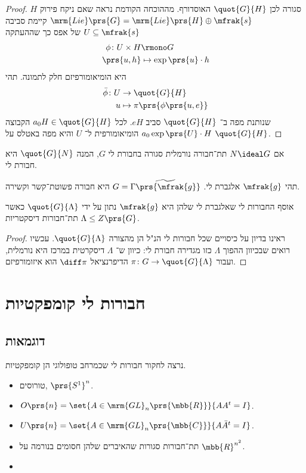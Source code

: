 \documentclass[10pt, twoside]{book}
\newcommand{\Lie}{\mrm{Lie}}
\begin{document}
\begin{proof}
$H$
סגורה לכן
$\quot{G}{H}$
האוסדורף.
מההוכחה הקודמת נראה שאם ניקח פירוק
$\Lie\prs{G} = \Lie\prs{H} \oplus \mfrak{s}$
קיימת סביבה
$U \subseteq \mfrak{s}$
של אפס כך שההעתקה
\begin{align*}
\phi \colon U \times H &\rmono G \\
\prs{u,h} &\mapsto \exp\prs{u} \cdot h
\end{align*}
היא הומיאומורפיזם חלק לתמונה.
תהי
\begin{align*}
\bar{\phi} \colon U &\to \quot{G}{H} \\
u &\mapsto \pi\prs{\phi\prs{u,e}}
\end{align*}
שנותנת מפה ב־%
$\quot{G}{H}$
סביב
$eH$.
לכל
$a_0 H \in \quot{G}{H}$
הקבוצה
$a_0 \exp\prs{U} \cdot H$
הומיאומורפית ל־%
$U$
והיא מפה באטלס על
$\quot{G}{H}$.
\end{proof}

\begin{corollary}
אם
$N \ideal G$
תת־חבורה נורמלית סגורה בחבורת לי
$G$,
המנה
$\quot{G}{N}$
היא חבורת לי.
\end{corollary}

\begin{corollary}
תהי
$\mfrak{g}$
אלגברת לי.
$G = \widetilde{\Gamma\prs{\mfrak{g}}}$
היא חבורה פשוטת־קשר וקשירה.

אוסף החבורות לי שאלגברת לי שלהן היא
$\mfrak{g}$
נתון על ידי
$\quot{G}{\Lambda}$
כאשר
$\Lambda \leq Z\prs{G}$
תת־חבורות דיסקטריות.
\end{corollary}

\begin{proof}
ראינו בדיון על כיסויים שכל חבורות לי הנ"ל הן מהצורה
$\quot{G}{\Lambda}$.
עכשיו רואים שבכיוון ההפוך
$\Lambda$
כזו מגדירה חבורת לי: כיוון ש־%
$\Lambda$
דיסקרטית במרכז היא נורמלית,
ועבור
$\pi \colon G \to \quot{G}{\Lambda}$
הדיפרנציאל
$\diff \pi$
הוא איזומורפיזם.
\end{proof}

\section{חבורות לי קומפקטיות}

\subsection{דוגמאות}

נרצה לחקור חבורות לי שכמרחב טופולוגי הן קומפקטיות.

\begin{example}
\begin{itemize}
\item טורוסים,
$\prs{S^1}^n$.
\item $O\prs{n} = \set{A \in \mrm{GL}_n\prs{\mbb{R}}}{A A^t = I}$.
\item $U\prs{n} = \set{A \in \mrm{GL}_n\prs{\mbb{C}}}{A \bar{A}^t = I}$.
\item תת־חבורות סגורות שהאיברים שלהן חסומים בנורמה על
$\mbb{R}^{n^2}$.
\item 
\end{itemize}
\end{example}
\end{document}
